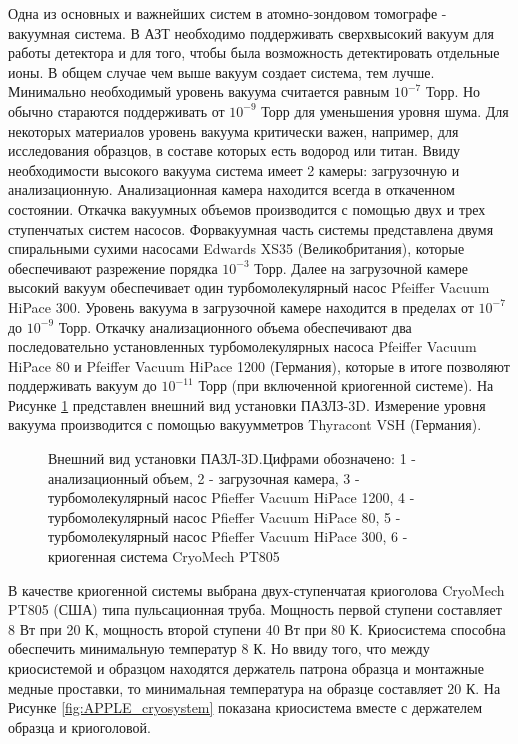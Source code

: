 Одна из основных и важнейших систем в атомно-зондовом томографе - вакуумная система. В АЗТ необходимо поддерживать сверхвысокий вакуум для работы детектора и для того, чтобы была возможность детектировать отдельные ионы. В общем случае чем выше вакуум создает система, тем лучше. Минимально необходимый уровень вакуума считается равным $10^{-7}$ Торр. Но обычно стараются поддерживать от $10^{-9}$ Торр для уменьшения уровня шума. Для некоторых материалов уровень вакуума критически важен, например, для исследования образцов, в составе которых есть водород или титан.
Ввиду необходимости высокого вакуума система имеет 2 камеры: загрузочную и анализационную. Анализационная камера находится всегда в откаченном состоянии. Откачка вакуумных объемов производится с помощью двух и трех ступенчатых систем насосов. Форвакуумная часть системы представлена двумя спиральными сухими насосами Edwards XS35 (Великобритания), которые обеспечивают разрежение порядка $10^{-3}$ Торр. Далее на загрузочной камере высокий вакуум обеспечивает один турбомолекулярный насос Pfeiffer Vacuum HiPace 300. Уровень вакуума в загрузочной камере находится в пределах от $10^{-7}$ до $10^{-9}$ Торр. Откачку анализационного объема обеспечивают два последовательно установленных турбомолекулярных насоса Pfeiffer Vacuum HiPace 80 и Pfeiffer Vacuum HiPace 1200 (Германия), которые в итоге позволяют поддерживать вакуум до $10^{-11}$ Торр (при включенной криогенной системе). На Рисунке \cref{fig:APPLE_foto_main} представлен внешний вид установки ПАЗЛЗ-3D. Измерение уровня вакуума производится с помощью вакуумметров Thyracont VSH (Германия).

\begin{figure}[htb]
	\caption{Внешний вид установки ПАЗЛ-3D.Цифрами обозначено: 1 - анализационный объем, 2 - загрузочная камера, 3 - турбомолекулярный насос Pfieffer Vacuum HiPace 1200, 4 - турбомолекулярный насос Pfieffer Vacuum HiPace 80, 5 - турбомолекулярный насос Pfieffer Vacuum HiPace 300, 6 - криогенная система CryoMech PT805}
	\label{fig:APPLE_foto_main}
\end{figure}

\FloatBarrier
В качестве криогенной системы выбрана двух-ступенчатая криоголова CryoMech PT805 (США)  типа пульсационная труба. Мощность первой ступени составляет 8 Вт при 20 К, мощность второй ступени 40 Вт при 80 К. Криосистема способна обеспечить минимальную температур 8 К. Но ввиду того, что между криосистемой и образцом находятся держатель патрона образца и монтажные медные проставки, то минимальная температура на образце составляет 20 К. На Рисунке \cref{fig:APPLE_cryosystem} показана криосистема вместе с держателем образца и криоголовой.

